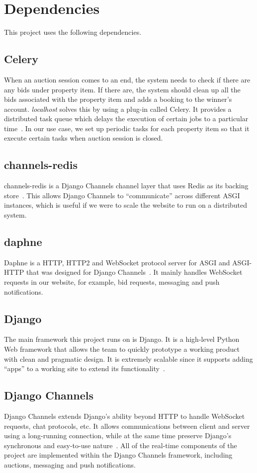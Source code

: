 \section{Dependencies}
This project uses the following dependencies.

\subsection{Celery}
When an auction session comes to an end, the system needs to check if there are
any bids under property item. If there are, the system should clean up all the
bids associated with the property item and adds a booking to the winner's
account. \emph{localhost} solves this by using a plug-in called Celery. It
provides a distributed task queue which delays the execution of certain jobs to
a particular time~\parencite{celery-doc}. In our use case, we set up periodic tasks for each property
item so that it execute certain tasks when auction session is closed.

\subsection{channels-redis}
channels-redis is a Django Channels channel layer that uses Redis as its backing
store~\parencite{channels-redis-doc}. This allows Django Channels to ``communicate''
across different ASGI instances, which is useful if we were to scale the
website to run on a distributed system.

\subsection{daphne}
Daphne is a HTTP, HTTP2 and WebSocket protocol server for ASGI and ASGI-HTTP
that was designed for Django Channels~\parencite{daphne}. It mainly handles WebSocket requests in
our website, for example, bid requests, messaging and push notifications.

\subsection{Django}
The main framework this project runs on is Django. It is a high-level Python Web
framework that allows the team to quickly prototype a working product with clean
and pragmatic design. It is extremely scalable since it supports adding ``apps''
to a working site to extend its functionality~\parencite{django}. %

\subsection{Django Channels}
Django Channels extends Django's ability beyond HTTP to handle WebSocket
requests, chat protocols, etc. It allows communications between client and
server using a long-running connection, while at the same time preserve Django's
synchronous and easy-to-use nature~\parencite{django-channels-doc}. All of the
real-time components of the project are implemented within the Django Channels
framework, including auctions, messaging and push notifications.

